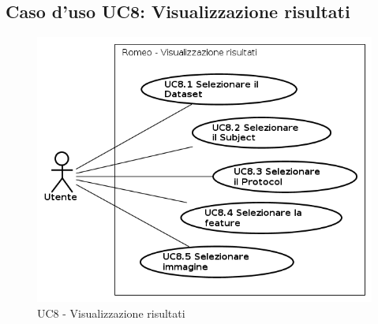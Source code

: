 \subsection{Caso d'uso UC8: Visualizzazione risultati}
\begin{figure}[!h]
\begin{center}
\includegraphics[scale=0.6]{./img/Use_Case/UC8}
\caption{UC8 - Visualizzazione risultati}
\end{center}
\end{figure}
